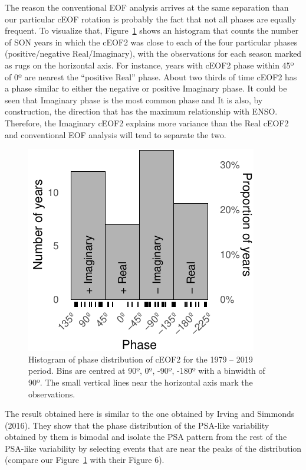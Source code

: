 \documentclass[smallextended]{svjour3}       %
\begin{document}
The reason the conventional EOF analysis arrives at the same separation than our particular cEOF rotation is probably the fact that not all phases are equally frequent.
To visualize that, Figure~\ref{fig:phase-histogram} shows an histogram that counts the number of SON years in which the cEOF2 was close to each of the four particular phases (positive/negative Real/Imaginary), with the observations for each season marked as rugs on the horizontal axis.
For instance, years with cEOF2 phase within 45º of 0º are nearest the ``positive Real'' phase.
About two thirds of time cEOF2 has a phase similar to either the negative or positive Imaginary phase.
It could be seen that Imaginary phase is the most common phase and It is also, by construction, the direction that has the maximum relationship with ENSO.
Therefore, the Imaginary cEOF2 explains more variance than the Real cEOF2 and conventional EOF analysis will tend to separate the two.



\begin{figure}
\centering
\includegraphics{../figures/phase-histogram-1.pdf}
\caption{\label{fig:phase-histogram}Histogram of phase distribution of cEOF2 for the 1979 -- 2019 period. Bins are centred at 90º, 0º, -90º, -180º with a binwidth of 90º. The small vertical lines near the horizontal axis mark the observations.}
\end{figure}

The result obtained here is similar to the one obtained by Irving and Simmonds (2016).
They show that the phase distribution of the PSA-like variability obtained by them is bimodal and isolate the PSA pattern from the rest of the PSA-like variability by selecting events that are near the peaks of the distribution (compare our Figure~\ref{fig:phase-histogram} with their Figure 6).
\end{document}
